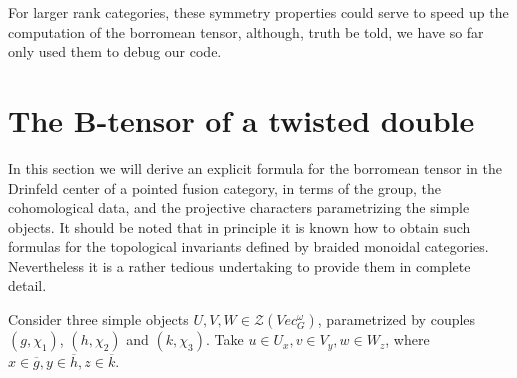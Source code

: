 \documentclass[a4paper, 10pt]{book}
\theoremstyle{definition}
\numberwithin{equation}{chapter}
\newcommand{\gb}{\overline{g}}
\newcommand{\hb}{\overline{h}}
\newcommand{\kb}{\overline{k}}
\begin{document}
For larger rank categories, these symmetry properties could serve to speed up the computation of the borromean tensor, although, truth be told, we have so far only used them to debug our code.
\section{The B-tensor of a twisted double}\label{sec:borr-tens-twist}
\newcommand\Pe{P}

In this section we will derive an explicit formula for the borromean tensor in the Drinfeld center of a pointed fusion category, in terms of the group, the cohomological data, and the projective characters parametrizing the simple objects. It should be noted that in principle it is known how to obtain such formulas for the topological invariants defined by braided monoidal categories. Nevertheless it is a rather tedious undertaking to provide them in complete detail.


Consider three simple objects $ U, V, W \in  \mathcal{Z}(Vec^\omega_G)$, parametrized by couples $(g, \chi_1)$, $(h, \chi_2)$ and $(k, \chi_3)$. Take $u\in U_x, v\in V_y,  w\in W_z$, where $x\in \gb, y\in \hb, z\in \kb$.
\end{document}
